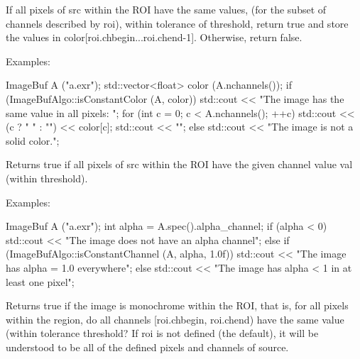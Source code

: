  

If all pixels of {\cf src} within the ROI have the same values, (for the
subset of channels described by {\cf roi}), within
tolerance of {\cf threshold}, return {\cf true} and store
the values in {\cf color[roi.chbegin...roi.chend-1]}.  Otherwise, return
{\cf false}.

\smallskip
\noindent Examples:
\begin{code}
    ImageBuf A ("a.exr");
    std::vector<float> color (A.nchannels());
    if (ImageBufAlgo::isConstantColor (A, color)) {
        std::cout << "The image has the same value in all pixels: ";
        for (int c = 0;  c < A.nchannels();  ++c)
            std::cout << (c ? " " : "") << color[c];
        std::cout << "\n";
    } else {
        std::cout << "The image is not a solid color.\n";
    }
\end{code}
\apiend


 

Returns {\cf true} if all pixels of {\cf src} within the ROI have the
given {\cf channel} value {\cf val} (within {\cf threshold}).

\smallskip
\noindent Examples:
\begin{code}
    ImageBuf A ("a.exr");
    int alpha = A.spec().alpha_channel;
    if (alpha < 0)
        std::cout << "The image does not have an alpha channel\n";
    else if (ImageBufAlgo::isConstantChannel (A, alpha, 1.0f))
        std::cout << "The image has alpha = 1.0 everywhere\n";
    else
        std::cout << "The image has alpha < 1 in at least one pixel\n";
\end{code}
\apiend

 

Returns {\cf true} if the image is monochrome within the ROI, that is, for
all pixels within the region, do all channels {\cf [roi.chbegin, roi.chend)}
have the same value (within tolerance {\cf threshold}?  If roi is not
defined (the default), it will be understood to be all of the defined pixels
and channels of source.

